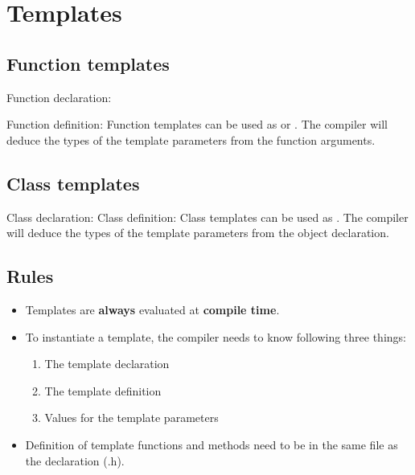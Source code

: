 \section{Templates}
\subsection{Function templates}
Function declaration:
\vspace{-2mm}
\vspace{-2mm}

Function definition:
\vspace{-2mm}
\vspace{-2mm}
Function templates can be used as  or . The compiler will deduce the types of the template parameters from the function arguments.

\subsection{Class templates}
Class declaration:
\vspace{-2mm}
\vspace{-2mm}
Class definition:
\vspace{-2mm}
\vspace{-2mm}
Class templates can be used as . The compiler will deduce the types of the template parameters from the object declaration.

\subsection{Rules}
\begin{itemize}
    \item Templates are \textbf{always} evaluated at \textbf{compile time}.
    \item To instantiate a template, the compiler needs to know following three things:
    \begin{enumerate}
        \item The template declaration
        \item The template definition
        \item Values for the template parameters
    \end{enumerate}
    \item Definition of template functions and methods need to be in the same file as the declaration (.h).
\end{itemize}